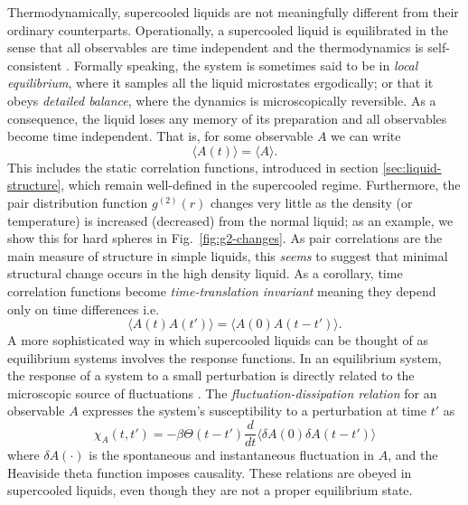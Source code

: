 \documentclass[11pt,twoside]{report}
\begin{document}
Thermodynamically, supercooled liquids are not meaningfully different from their ordinary counterparts.
Operationally, a supercooled liquid is equilibrated in the sense that all observables are time independent and the thermodynamics is self-consistent%
.
Formally speaking, the system is sometimes said to be in \emph{local equilibrium}, where it samples all the liquid microstates ergodically; or that it obeys \emph{detailed balance}, where the dynamics is microscopically reversible.
As a consequence, the liquid loses any memory of its preparation and all observables become time independent.
That is, for some observable $A$ we can write
\begin{equation*}
  \langle A(t) \rangle = \langle A \rangle.
\end{equation*}
This includes the static correlation functions, introduced in section \ref{sec:liquid-structure}, which remain well-defined in the supercooled regime.
Furthermore, the pair distribution function $g^{(2)}(r)$ changes very little as the density (or temperature) is increased (decreased) from the normal liquid; as an example, we show this for hard spheres in Fig.\ \ref{fig:g2-changes}.
As pair correlations are the main measure of structure in simple liquids, this \emph{seems} to suggest that minimal structural change occurs in the high density liquid.
As a corollary, time correlation functions become \emph{time-translation invariant} meaning they depend only on time differences i.e.\
\begin{equation*}
  \langle A(t) A(t') \rangle = \langle A(0) A(t - t') \rangle.
\end{equation*}
A more sophisticated way in which supercooled liquids can be thought of as equilibrium systems involves the response functions.
In an equilibrium system, the response of a system to a small perturbation is directly related to the microscopic source of fluctuations%
\marginfootnote{Temperature, in the case of liquids.}.
The \emph{fluctuation-dissipation relation} for an observable $A$ expresses the system's susceptibility to a perturbation at time $t'$ as \cite{Chandler1987}
\begin{equation*}
  \chi_A (t, t')
  =
  - \beta \Theta(t - t')
  \frac{d}{dt}
  \big\langle
  \delta A(0)
  \delta A(t - t')
  \big\rangle
\end{equation*}
where $\delta A(\cdot)$ is the spontaneous and instantaneous fluctuation in $A$, and the Heaviside theta function imposes causality.
These relations are obeyed in supercooled liquids, even though they are not a proper equilibrium state.
\end{document}
